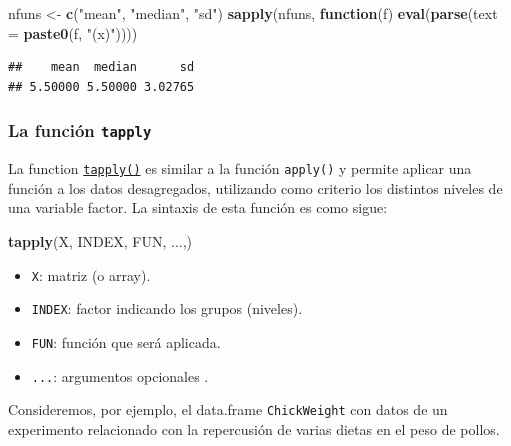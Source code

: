 \documentclass[
]{book}
\newenvironment{Shaded}{\begin{snugshade}}{\end{snugshade}}
\newcommand{\ControlFlowTok}[1]{\textcolor[rgb]{0.13,0.29,0.53}{\textbf{#1}}}
\newcommand{\DataTypeTok}[1]{\textcolor[rgb]{0.13,0.29,0.53}{#1}}
\newcommand{\KeywordTok}[1]{\textcolor[rgb]{0.13,0.29,0.53}{\textbf{#1}}}
\newcommand{\NormalTok}[1]{#1}
\newcommand{\StringTok}[1]{\textcolor[rgb]{0.31,0.60,0.02}{#1}}
\providecommand{\tightlist}{%
  \setlength{\itemsep}{0pt}\setlength{\parskip}{0pt}}
\begin{document}
\begin{Shaded}
\begin{Highlighting}[]
\NormalTok{nfuns <-}\StringTok{ }\KeywordTok{c}\NormalTok{(}\StringTok{"mean"}\NormalTok{, }\StringTok{"median"}\NormalTok{, }\StringTok{"sd"}\NormalTok{)}
\KeywordTok{sapply}\NormalTok{(nfuns, }\ControlFlowTok{function}\NormalTok{(f) }\KeywordTok{eval}\NormalTok{(}\KeywordTok{parse}\NormalTok{(}\DataTypeTok{text =} \KeywordTok{paste0}\NormalTok{(f, }\StringTok{"(x)"}\NormalTok{))))}
\end{Highlighting}
\end{Shaded}

\begin{verbatim}
##    mean  median      sd 
## 5.50000 5.50000 3.02765
\end{verbatim}

\hypertarget{la-funciuxf3n-tapply}{%
\subsubsection{\texorpdfstring{La función \texttt{tapply}}{La función tapply}}\label{la-funciuxf3n-tapply}}

La function \href{https://www.rdocumentation.org/packages/base/versions/3.6.1/topics/tapply}{\texttt{tapply()}} es
similar a la función \texttt{apply()} y permite aplicar una función a los datos desagregados,
utilizando como criterio los distintos niveles de una variable factor.
La sintaxis de esta función es como sigue:

\begin{Shaded}
\begin{Highlighting}[]
    \KeywordTok{tapply}\NormalTok{(X, INDEX, FUN, ...,)}
\end{Highlighting}
\end{Shaded}

\begin{itemize}
\tightlist
\item
  \texttt{X}: matriz (o array).
\item
  \texttt{INDEX}: factor indicando los grupos (niveles).
\item
  \texttt{FUN}: función que será aplicada.
\item
  \texttt{...}: argumentos opcionales .
\end{itemize}

Consideremos, por ejemplo, el data.frame \texttt{ChickWeight} con datos de un
experimento relacionado con la repercusión de varias dietas en el peso
de pollos.
\end{document}
